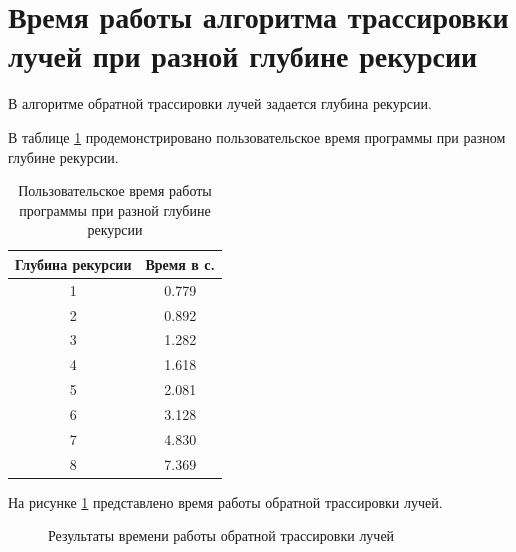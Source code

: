\section{Время работы алгоритма трассировки лучей при разной глубине рекурсии}

В алгоритме обратной трассировки лучей задается глубина рекурсии.

В таблице \ref{tab:time1} продемонстрировано пользовательское время программы при разном глубине рекурсии.

\begin{table}[ht!]
	\begin{center}
		
		\caption{Пользовательское время работы программы при разной глубине рекурсии}
		\label{tab:time1}
		\begin{tabular}{|c|c|}
			\hline
			Глубина рекурсии & Время в с. \\
			\hline
			1  & 0.779 \\
			\hline
			2  & 0.892 \\
			\hline
			3  & 1.282 \\
			\hline
			4  & 1.618 \\
			\hline
			5  & 2.081 \\
			\hline
			6  & 3.128\\
			\hline
			7  & 4.830\\
			\hline
			8  & 7.369\\
			\hline
			
		\end{tabular}
	\end{center}
\end{table}
\newpage
На рисунке \ref{graph:r} представлено время работы обратной трассировки лучей.

\begin{figure}[ht!]
	\begin{center}
		\captionsetup{singlelinecheck = false, justification=centerfirst}
		\centering
		\caption{Результаты времени работы обратной трассировки лучей}
		\label{graph:r}
	\end{center}
\end{figure}

